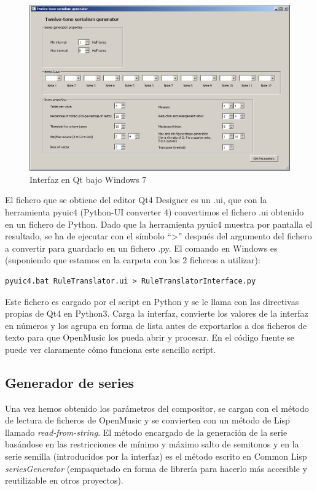 \documentclass[a4paper,openany,oneside,12pt]{book}
\begin{document}
\begin{figure}
\centering
\includegraphics[width=\textwidth]{img/qtprogram.png}
\caption{Interfaz en Qt bajo Windows 7} \label{fig:qtinterface}
\end{figure}

El fichero que se obtiene del editor Qt4 Designer es un .ui, que con la herramienta pyuic4 (Python-UI converter 4) convertimos el fichero .ui obtenido en un fichero de Python. Dado que la herramienta pyuic4 muestra por pantalla el resultado, se ha de ejecutar con el símbolo ``>'' después del argumento del fichero a convertir para guardarlo en un fichero .py. El comando en Windows es (suponiendo que estamos en la carpeta con los 2 ficheros a utilizar):

   \lstset{language=Bash,
           basicstyle=\ttfamily\scriptsize,
           keywordstyle=\ttfamily,
           stringstyle=\ttfamily,
           commentstyle=\ttfamily,
          breaklines=true
          }
\begin{lstlisting}
pyuic4.bat RuleTranslator.ui > RuleTranslatorInterface.py
\end{lstlisting}

Este fichero es cargado por el script en Python y se le llama con las directivas propias de Qt4 en Python3. Carga la interfaz, convierte los valores de la interfaz en números y los agrupa en forma de lista antes de exportarlos a dos ficheros de texto para que OpenMusic los pueda abrir y procesar. En el código fuente se puede ver claramente cómo funciona este sencillo script.

\subsection{Generador de series}
Una vez hemos obtenido los parámetros del compositor, se cargan con el método de lectura de ficheros de OpenMusic y se convierten con un método de Lisp llamado \emph{read-from-string}. El método encargado de la generación de la serie basándose en las restricciones de mínimo y máximo salto de semitonos y en la serie semilla (introducidos por la interfaz) es el método escrito en Common Lisp \emph{seriesGenerator} (empaquetado en forma de librería para hacerlo más accesible y reutilizable en otros proyectos).
\end{document}
